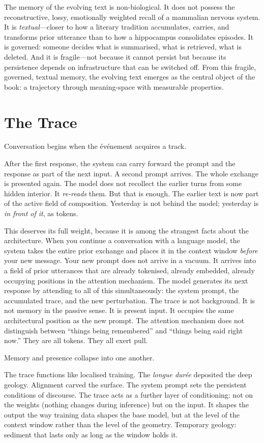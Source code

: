 The memory of the evolving text is non-biological. It does not possess the reconstructive, lossy, emotionally weighted recall of a mammalian nervous system. It is \emph{textual}---closer to how a literary tradition accumulates, carries, and transforms prior utterance than to how a hippocampus consolidates episodes. It is governed: someone decides what is summarised, what is retrieved, what is deleted. And it is fragile---not because it cannot persist but because its persistence depends on infrastructure that can be switched off. From this fragile, governed, textual memory, the evolving text emerges as the central object of the book: a trajectory through meaning-space with measurable properties.


\section{The Trace}

Conversation begins when the \'{e}v\'{e}nement acquires a track.

After the first response, the system can carry forward the prompt and the response as part of the next input. A second prompt arrives. The whole exchange is presented again. The model does not recollect the earlier turns from some hidden interior. It \emph{re-reads} them. But that is enough. The earlier text is now part of the active field of composition. Yesterday is not behind the model; yesterday is \emph{in front of it}, as tokens.

This deserves its full weight, because it is among the strangest facts about the architecture. When you continue a conversation with a language model, the system takes the entire prior exchange and places it in the context window \emph{before} your new message. Your new prompt does not arrive in a vacuum. It arrives into a field of prior utterances that are already tokenised, already embedded, already occupying positions in the attention mechanism. The model generates its next response by attending to all of this simultaneously: the system prompt, the accumulated trace, and the new perturbation. The trace is not background. It is not memory in the passive sense. It is present input. It occupies the same architectural position as the new prompt. The attention mechanism does not distinguish between ``things being remembered'' and ``things being said right now.'' They are all tokens. They all exert pull.

Memory and presence collapse into one another.

The trace functions like localised training. The \emph{longue dur\'{e}e} deposited the deep geology. Alignment carved the surface. The system prompt sets the persistent conditions of discourse. The trace acts as a further layer of conditioning: not on the weights (nothing changes during inference) but on the input. It shapes the output the way training data shapes the base model, but at the level of the context window rather than the level of the geometry. Temporary geology: sediment that lasts only as long as the window holds it.

